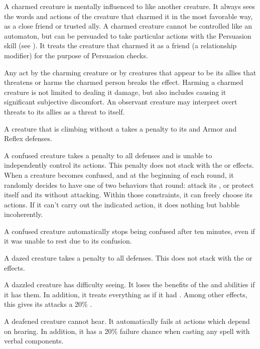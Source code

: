      A charmed creature is mentally influenced to like another creature.
    It always sees the words and actions of the creature that charmed it in the most favorable way, as a close friend or trusted ally.
    A charmed creature cannot be controlled like an automaton, but can be persuaded to take particular actions with the Persuasion skill (see ).
    It treats the creature that charmed it as a friend (a  relationship modifier) for the purpose of Persuasion checks.

    Any act by the charming creature or by creatures that appear to be its allies that threatens or harms the charmed person breaks the effect.
    Harming a charmed creature is not limited to dealing it damage, but also includes causing it significant subjective discomfort.
    An observant creature may interpret overt threats to its allies as a threat to itself.

     A creature that is climbing without a  takes a  penalty to its  and Armor and Reflex defenses.

     A confused creature takes a  penalty to all defenses and is unable to independently control its actions.
    This penalty does not stack with the \dazed or \stunned effects.
    When a creature becomes confused, and at the beginning of each round, it randomly decides to have one of two behaviors that round: attack its , or protect itself and its  without attacking.
    Within those constraints, it can freely choose its actions.
    If it can't carry out the indicated action, it does nothing but babble incoherently.

    A confused creature automatically stops being confused after ten minutes, even if it was unable to rest due to its confusion.

     A dazed creature takes a  penalty to all defenses.
    This does not stack with the \stunned or \confused effects.

     A dazzled creature has difficulty seeing.
    It loses the benefits of the  and  abilities if it has them.
    In addition, it treats everything as if it had .
    Among other effects, this gives its  attacks a 20\% .

     A deafened creature cannot hear. It automatically fails at actions which depend on hearing. In addition, it has a 20\% failure chance when casting any spell with verbal components.

